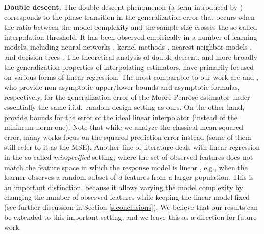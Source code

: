 \documentclass[11pt]{article}
\begin{document}
\textbf{Double descent.}
The double descent phenomenon (a term introduced by \cite{BHMM19})
corresponds to the phase transition in the generalization error that
occurs when the ratio between the model complexity and the
sample size crosses the so-called interpolation threshold. It has been observed empirically
in a number of learning models, including neural networks
\cite{BHMM19,GJSx19_TR}, kernel methods \cite{BMM18_TR,BRT18_TR},
nearest neighbor models \cite{BHM18_TR}, and decision trees \cite{BHMM19}. The
theoretical analysis of double descent, and more broadly the generalization
properties of interpolating estimators, have primarily focused on various forms of
linear regression. The most comparable
to our work are \cite{BLLT19_TR,LR18_TR} and \cite{HMRT19_TR}, who provide
non-asymptotic upper/lower bounds and asymptotic formulas,
respectively, for the generalization error of the Moore-Penrose 
estimator under essentially the same i.i.d.~random design setting as
ours. On the other hand, \cite{MVSS19_TR} provide bounds for the error
of the ideal linear interpolator (instead of the minimum norm
one). Note that while we analyze the classical mean squared error, many
works focus on the squared prediction error instead (some of them still
refer to it as the MSE).
Another line of literature deals with linear regression in the
so-called \emph{misspecified} setting, where the set of observed
features does not match the feature space in
which the response model is linear
\cite{belkin2019two,HMRT19_TR,Mit19_TR,MM19_TR}, e.g., when the
learner observes a random subset of $d$ features from a larger
population. This is an important distinction, 
because it allows varying the model complexity by changing the number
of observed features while keeping the linear model fixed (see further
discussion in Section \ref{s:conclusions}). We believe
that our results can be extended to this important setting, and we leave
this as a direction for future work.

\end{document}
